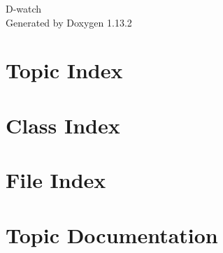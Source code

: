 \documentclass[twoside]{book}
\newcommand{\+}{\discretionary{\mbox{\scriptsize$\hookleftarrow$}}{}{}}
\newcommand{\clearemptydoublepage}{%
    \newpage{\pagestyle{empty}\cleardoublepage}%
  }
\begin{document}
  \raggedbottom
    \hypersetup{pageanchor=false,
                bookmarksnumbered=true,
                pdfencoding=unicode
               }
  \begin{titlepage}
  \vspace*{7cm}
  \begin{center}%
  {\Large D-\/watch}\\
  \vspace*{1cm}
  {\large Generated by Doxygen 1.13.2}\\
  \end{center}
  \end{titlepage}
  \clearemptydoublepage
  \tableofcontents
  \clearemptydoublepage
  \hypersetup{pageanchor=true}

\chapter{Topic Index}

\chapter{Class Index}

\chapter{File Index}

\chapter{Topic Documentation}


















\end{document}
